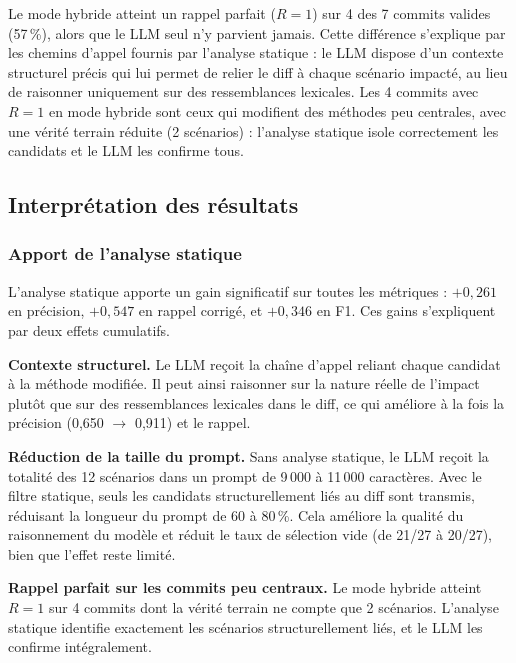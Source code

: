 \documentclass[12pt,a4paper]{article}
\begin{document}
\noindent Le mode hybride atteint un rappel parfait ($R = 1$) sur 4 des 7 commits
valides (57\,\%), alors que le LLM seul n'y parvient jamais. Cette différence
s'explique par les chemins d'appel fournis par l'analyse statique : le LLM
dispose d'un contexte structurel précis qui lui permet de relier le diff à chaque
scénario impacté, au lieu de raisonner uniquement sur des ressemblances lexicales.
Les 4 commits avec $R = 1$ en mode hybride sont ceux qui modifient des méthodes
peu centrales, avec une vérité terrain réduite (2 scénarios) : l'analyse statique
isole correctement les candidats et le LLM les confirme tous.

\subsection{Interprétation des résultats}

\subsubsection{Apport de l'analyse statique}

L'analyse statique apporte un gain significatif sur toutes les métriques :
$+0{,}261$ en précision, $+0{,}547$ en rappel corrigé, et $+0{,}346$ en F1.
Ces gains s'expliquent par deux effets cumulatifs.

\textbf{Contexte structurel.} Le LLM reçoit la chaîne d'appel reliant
chaque candidat à la méthode modifiée. Il peut ainsi raisonner sur la
nature réelle de l'impact plutôt que sur des ressemblances lexicales dans
le diff, ce qui améliore à la fois la précision (0{,}650 $\to$ 0{,}911)
et le rappel.

\textbf{Réduction de la taille du prompt.} Sans analyse statique, le LLM
reçoit la totalité des 12 scénarios dans un prompt de 9\,000 à 11\,000
caractères. Avec le filtre statique, seuls les candidats structurellement
liés au diff sont transmis, réduisant la longueur du prompt de 60 à 80\,\%.
Cela améliore la qualité du raisonnement du modèle et réduit le taux de
sélection vide (de 21/27 à 20/27), bien que l'effet reste limité.

\textbf{Rappel parfait sur les commits peu centraux.} Le mode hybride
atteint $R = 1$ sur 4 commits dont la vérité terrain ne compte que
2 scénarios. L'analyse statique identifie exactement les scénarios
structurellement liés, et le LLM les confirme intégralement.
\end{document}

